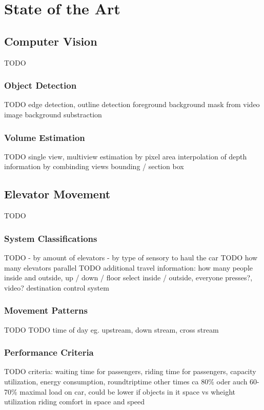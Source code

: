 \chapter{State of the Art}
\label{chap:sota}

\section{Computer Vision}

TODO

\subsection{Object Detection}

TODO
edge detection, outline detection
foreground background mask from video image
background substraction

\subsection{Volume Estimation}

TODO
single view, multiview
estimation by pixel area
interpolation of depth information by combinding views
bounding / section box

\section{Elevator Movement}
TODO

\subsection{System Classifications}
TODO
- by amount of elevators
- by type of sensory to haul the car
TODO how many elevators parallel
TODO additional travel information: how many people inside and outside, up / down / floor select inside / outside, everyone presses?, video? 
destination control system

\subsection{Movement Patterns}
TODO
TODO time of day eg. upstream, down stream, cross stream

\subsection{Performance Criteria}
TODO
criteria: waiting time for passengers, riding time for passengers, capacity utilization, energy consumption, roundtriptime other times
ca 80\% oder auch 60-70\% maximal load on car, could be lower if objects in it
space vs wheight utilization
riding comfort in space and speed

